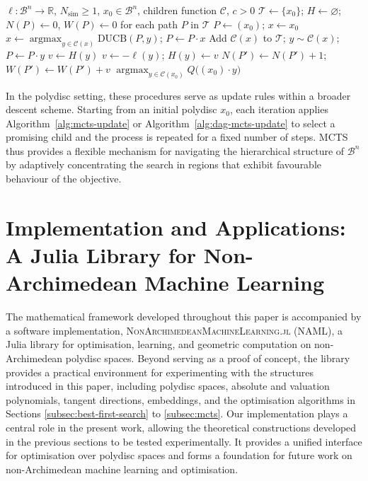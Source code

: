 \documentclass[10pt]{article}
\theoremstyle{definition}
\newcommand{\RR}{\mathbb{R}}
\DeclareMathOperator{\argmax}{argmax}
\begin{document}
\begin{algorithm}[H]
  \begin{algorithmic}[1]
    \Require $\ell \colon \mathcal{B}^n \to \RR$, $N_\mathrm{sim} \ge 1$, $x_0 \in \mathcal{B}^n$, children function $\mathcal{C}$, $c > 0$
    \State $\mathcal{T} \gets \{x_0\}$; $H \gets \varnothing$; $N(P) \gets 0$, $W(P) \gets 0$ for each path $P$ in $\mathcal{T}$
      \State $P \gets (x_0)$; $x \gets x_0$ 
        \State $x \gets \argmax_{y \in \mathcal{C}(x)} \mathrm{DUCB}(P, y)$; $P \gets P \cdot x$
      \EndWhile
      \State Add $\mathcal{C}(x)$ to $\mathcal{T}$; $y \sim \mathcal{C}(x)$; $P \gets P \cdot y$ 
       
        \State $v \gets H(y)$
      \Else
        \State $v \gets -\ell(y)$; $H(y) \gets v$
      \EndIf
       
        \State $N(P') \gets N(P') + 1$; $W(P') \gets W(P') + v$
      \EndFor
    \EndFor
    \Return $\argmax_{y \in \mathcal{C}(x_0)} Q\bigl((x_0) \cdot y\bigr)$
  \end{algorithmic} 
  \caption{Update rule for DAG-MCTS on the Polydisc Space}
  \label{alg:dag-mcts-update}
\end{algorithm}


In the polydisc setting, these procedures serve as update rules within a broader descent scheme. Starting from an initial polydisc $x_0$, each iteration applies Algorithm~\ref{alg:mcts-update} or Algorithm~\ref{alg:dag-mcts-update} to select a promising child and the process is repeated for a fixed number of steps. MCTS thus provides a flexible mechanism for navigating the hierarchical structure of $\mathcal{B}^n$ by adaptively concentrating the search in regions that exhibit favourable behaviour of the objective.


\section{Implementation and Applications:\\ A Julia Library for Non-Archimedean Machine Learning}
\label{sec:applications}
The mathematical framework developed throughout this paper is accompanied by a software implementation, \textsc{NonArchimedeanMachineLearning.jl} (NAML), a Julia library for optimisation, learning, and geometric computation on non-Archimedean polydisc spaces. Beyond serving as a proof of concept, the library provides a practical environment for experimenting with the structures introduced in this paper, including polydisc spaces, absolute and valuation polynomials, tangent directions, embeddings, and the optimisation algorithms in Sections \ref{subsec:best-first-search} to \ref{subsec:mcts}.
Our implementation plays a central role in the present work, allowing the theoretical constructions developed in the previous sections to be tested experimentally. It provides a unified interface for optimisation over polydisc spaces and forms a foundation for future work on non-Archimedean machine learning and optimisation.
\end{document}
